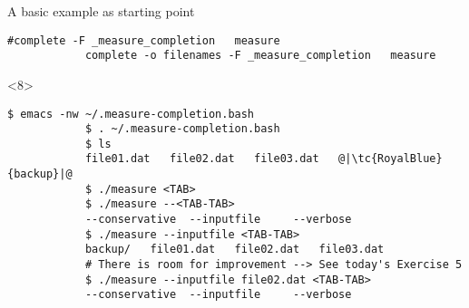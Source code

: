 \begin{frame}[fragile]{A basic example as starting point}
\begin{onlyenv}
\begin{lstlisting}[style=myBash, numbers=none, style=smaller]
            #complete -F _measure_completion   measure
            complete -o filenames -F _measure_completion   measure
        \end{lstlisting}
    \end{onlyenv}
    \begin{onlyenv}<8>
        \begin{lstlisting}[style=myBash, numbers=none, aboveskip=4mm]
            $ emacs -nw ~/.measure-completion.bash
            $ . ~/.measure-completion.bash
            $ ls
            file01.dat   file02.dat   file03.dat   @|\tc{RoyalBlue}{backup}|@
            $ ./measure <TAB>
            $ ./measure --<TAB-TAB>
            --conservative  --inputfile     --verbose
            $ ./measure --inputfile <TAB-TAB>
            backup/   file01.dat   file02.dat   file03.dat
            # There is room for improvement --> See today's Exercise 5
            $ ./measure --inputfile file02.dat <TAB-TAB>
            --conservative  --inputfile     --verbose
        \end{lstlisting}
    \end{onlyenv}
\end{frame}
